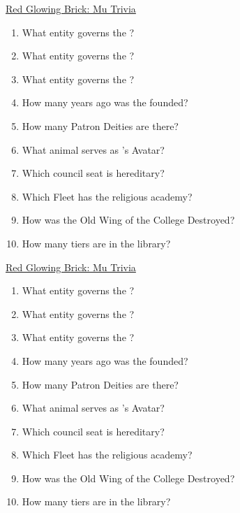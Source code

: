 \documentclass[white]{GL2020}
\begin{document}
\name{\wTriviaMu{}}

\vspace*{0.5cm}
\begin{center}
{\LARGE \underline{Red Glowing Brick: Mu Trivia}}\\
\vspace{0.5cm}

\begin{multicols}{2}
\begin{enumerate}
	\item What entity governs the \pFarm{}?
	\item What entity governs the \pTech{}?
	\item What entity governs the \pShip{}?
	\item How many years ago was the \pSchool{} founded?
	\item How many Patron Deities are there?
	\item What animal serves as \cFarmGod{}'s Avatar?
	\item Which \pTech{} council seat is hereditary?
	\item Which \pShip{} Fleet has the religious academy?
	\item How was the Old Wing of the College Destroyed?
	\item How many tiers are in the library?
\end{enumerate}
\end{multicols}

\vspace{8cm}
{\LARGE \underline{Red Glowing Brick: Mu Trivia}}\\
\vspace{0.5cm}
\begin{multicols}{2}
\begin{enumerate}
	\item What entity governs the \pFarm{}?
	\item What entity governs the \pTech{}?
	\item What entity governs the \pShip{}?
	\item How many years ago was the \pSchool{} founded?
	\item How many Patron Deities are there?
	\item What animal serves as \cFarmGod{}'s Avatar?
	\item Which \pTech{} council seat is hereditary?
	\item Which \pShip{} Fleet has the religious academy?
	\item How was the Old Wing of the College Destroyed?
	\item How many tiers are in the library?
\end{enumerate}
\end{multicols}



\end{center}
\end{document}
